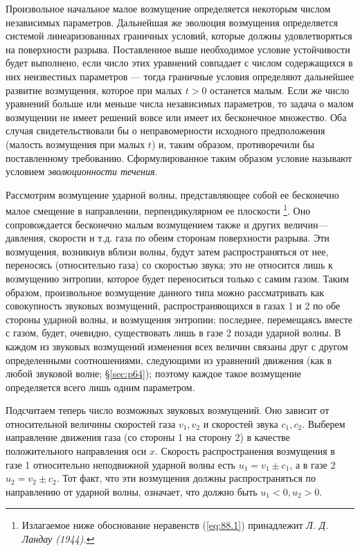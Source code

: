 Произвольное начальное малое возмущение определяется некоторым числом
независимых параметров. Дальнейшая же эволюция возмущения определяется системой
линеаризованных граничных условий, которые должны удовлетворяться на
поверхности разрыва. Поставленное выше необходимое условие устойчивости будет
выполнено, если число этих уравнений совпадает с числом содержащихся в них
неизвестных параметров — тогда граничные условия определяют дальнейшее развитие
возмущения, которое при малых $t > 0$ останется малым. Если же число уравнений
больше или меньше числа независимых параметров, то задача о малом возмущении не
имеет решений вовсе или имеет их бесконечное множество. Оба случая
свидетельствовали бы о неправомерности исходного предположения (малость
возмущения при малых $t$) и, таким образом, противоречили бы поставленному
требованию. Сформулированное таким образом условие называют условием
\emph{эволюционности течения}.

Рассмотрим возмущение ударной волны, представляющее собой ее бесконечно малое
смещение в направлении, перпендикулярном ее плоскости \footnote{Излагаемое ниже
обоснование неравенств (\ref{eq:88.1}) принадлежит \emph{Л. Д. Ландау
(1944).}}. Оно сопровождается бесконечно малым возмущением также и других
величин—давления, скорости и т.д. газа по обеим сторонам поверхности разрыва.
Эти возмущения, возникнув вблизи волны, будут затем распространяться от нее,
переносясь (относительно газа) со скоростью звука; это не относится лишь к
возмущению энтропии, которое будет переноситься только с самим газом. Таким
образом, произвольное возмущение данного типа можно рассматривать как
совокупность звуковых возмущений, распространяющихся в газах 1 и 2 по обе
стороны ударной волны, и возмущения энтропии; последнее, перемещаясь вместе с
газом, будет, очевидно, существовать лишь в газе 2 позади ударной волны. В
каждом из звуковых возмущений изменения всех величин связаны друг с другом
определенными соотношениями, следующими из уравнений движения (как в любой
звуковой волне; \S \ref{sec:p64}); поэтому каждое такое возмущение определяется всего лишь
одним параметром.

Подсчитаем теперь число возможных звуковых возмущений. Оно зависит от
относительной величины скоростей газа $v_1, v_2$ и скоростей звука $c_1, c_2$.
Выберем направление движения газа (со стороны 1 на сторону 2) в качестве
положительного направления оси $x$. Скорость распространения возмущения в газе
1 относительно неподвижной ударной волны есть $u_1 = v_1 \pm c_1$, а в газе 2
$u_2 = v_2 \pm c_2$. Тот факт, что эти возмущения должны распространяться по
направлению от ударной волны, означает, что должно быть $u_1 < 0, u_2 > 0$.

